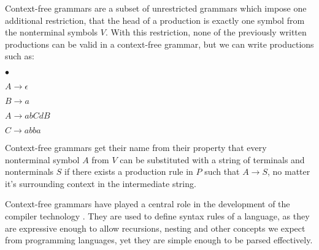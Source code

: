 Context-free grammars are a subset of unrestricted grammars which impose one additional restriction, that the head of a production is exactly one symbol from the nonterminal symbols $V$. With this restriction, none of the previously written productions can be valid in a context-free grammar, but we can write productions such as:
\begin{list}{$\bullet$}{}  	
	\item $A \rightarrow \epsilon$
	\item $B \rightarrow a$
	\item $A \rightarrow abCdB$
	\item $C \rightarrow abba$
\end{list}

Context-free grammars get their name from their property that every nonterminal symbol $A$ from $V$ can be substituted with a string of terminals and nonterminals $S$ if there exists a production rule in $P$ such that $A \rightarrow S$, no matter it's surrounding context in the intermediate string.

Context-free grammars have played a central role in the development of the compiler technology \citep{hopcroft2007automatatheory}. They are used to define syntax rules of a language, as they are expressive enough to allow recursions, nesting and other concepts we expect from programming languages, yet they are simple enough to be parsed effectively.